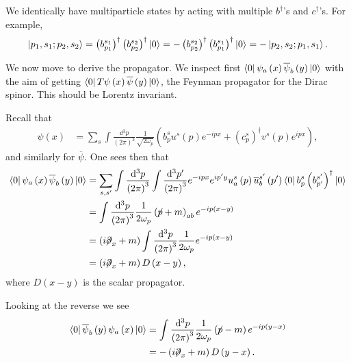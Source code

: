 We identically have multiparticle states by acting with multiple $b^{\dag}$'s and $c^{\dag}$'s. For example,
\begin{align}
    \ket{p_1, s_1 ; p_2 , s_2} = \left( b_{p_1}^{s_1} \right)^{\dag} \left( b_{p_2}^{s_2} \right)^{\dag} \ket{0} = -  \left( b_{p_2}^{s_2} \right)^{\dag} \left( b_{p_1}^{s_1} \right)^{\dag} \ket{0} = - \ket{p_2, s_2 ; p_1, s_1}
.\end{align}

We now move to derive the propagator. We inspect first $\bra{0} \psi_a \left( x \right) \overline{\psi}_b \left( y \right) \ket{0}$ with the aim of getting $\bra{0} T \psi \left( x \right) \overline{\psi}\left( y \right) \ket{0}$, the Feynman propagator for the Dirac spinor. This should be Lorentz invariant.

Recall that
\begin{align}
    \psi \left( x \right) &= \sum_{s}^{} \int \frac{\dd{^3p}}{\left( 2\pi\right)^3} \frac{1}{\sqrt{2\omega_p} } \left( b_p^{s} u^{s}\left( p \right) e^{-ipx} + \left( c_p^{s} \right)^{\dag} v^{s}\left( p \right) e^{i px} \right) 
,\end{align}
and similarly for $\overline{\psi}$. One sees then that
\begin{align}
    \bra{0} \psi_a \left( x \right) \overline{\psi}_b \left( y \right) \ket{0} &= \sum_{s,s'}^{} \int \frac{\dd{^3p}}{\left( 2\pi\right)^3} \int \frac{\dd{^3p'}}{\left( 2\pi\right)^3} e^{-ipx} e^{i p'y} u_a^{s}\left( p \right) \overline{u}_b^{s'}\left( p' \right) \bra{0} b_p^{s} \left( b_{p'}^{s'} \right)^{\dag} \ket{0} \\
    &= \int \frac{\dd{^3p}}{\left( 2\pi\right)^3} \frac{1}{2\omega_p} \left( \fbs{p} + m \right)_{ab} e^{-i p \left( x -y \right) } \\
    &=  \left( i\fbs{\partial}_x + m \right) \int \frac{\dd{^3p}}{\left( 2\pi\right)^3} \frac{1}{2\omega_p} e^{-i p \left( x -y \right) } \\
    &= \left( i \fbs{\partial}_x + m \right) D \left( x - y \right) 
,\end{align}
where $D \left( x -y \right) $ is the scalar propagator.

Looking at the reverse we see
\begin{align}
    \bra{0} \overline{\psi}_b \left( y \right) \psi_a \left( x \right) \ket{0} &= \int \frac{\dd{^3 p}}{\left( 2\pi\right)^3} \frac{1}{2\omega_p} \left( \fbs{p} - m \right)  e^{-i p \left( y - x \right) } \\
    &= - \left( i  \fbs{\partial}_x + m \right) D \left( y - x \right) 
.\end{align}


